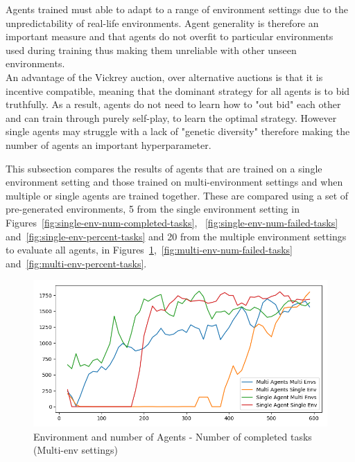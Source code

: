 Agents trained must able to adapt to a range of environment settings due to the unpredictability of real-life
environments. Agent generality is therefore an important measure and that agents do not overfit to particular
environments used during training thus making them unreliable with other unseen environments. \\
An advantage of the Vickrey auction, over alternative auctions is that it is incentive compatible, meaning that the
dominant strategy for all agents is to bid truthfully. As a result, agents do not need to learn how to "out bid" each
other and can train through purely self-play, to learn the optimal strategy. However single agents may struggle with a
lack of "genetic diversity" therefore making the number of agents an important hyperparameter.

This subsection compares the results of agents that are trained on a single environment setting and those trained on
multi-environment settings and when multiple or single agents are trained together. These are compared using a set of
pre-generated environments, 5 from the single environment setting in Figures~\ref{fig:single-env-num-completed-tasks},
~\ref{fig:single-env-num-failed-tasks} and~\ref{fig:single-env-percent-tasks} and 20 from the multiple environment
settings to evaluate all agents, in Figures~\ref{fig:multi-env-num-completed-tasks},~\ref{fig:multi-env-num-failed-tasks}
and~\ref{fig:multi-env-percent-tasks}.

\begin{figure}[H]
    \centering
    \includegraphics[width=\linewidth]{figures/5_evaluation_figs/env_agent_num_training_fig/num_completed_tasks.png}
    \caption{Environment and number of Agents - Number of completed tasks (Multi-env settings)}
    \label{fig:multi-env-num-completed-tasks}
\end{figure}

